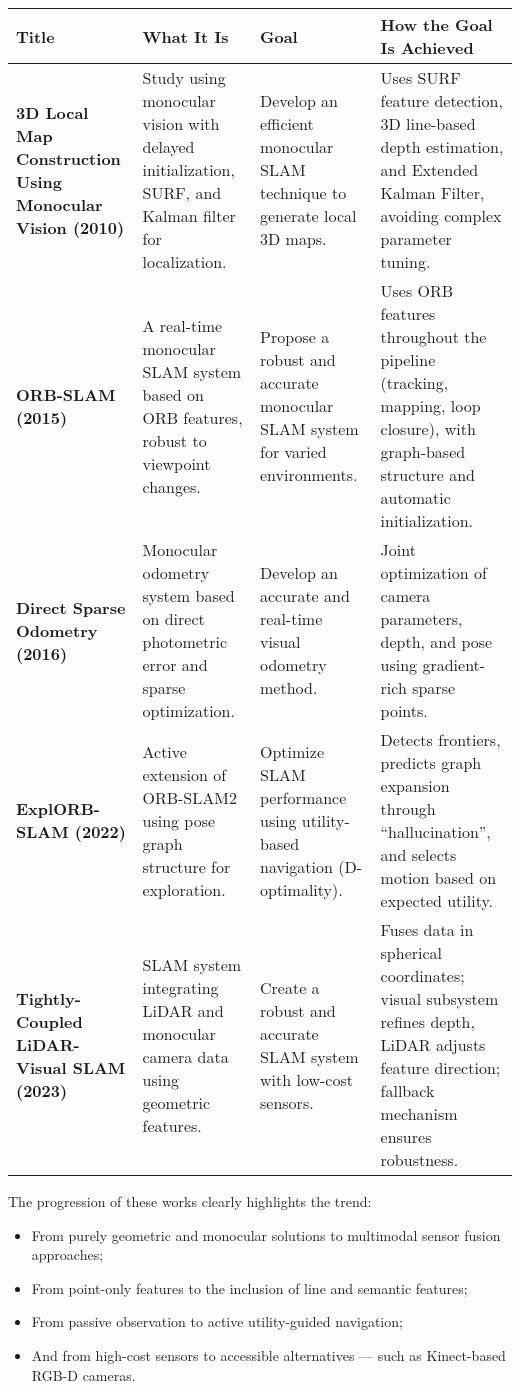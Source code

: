 \documentclass[a4paper,12pt]{article}
\newcommand{\cellwrap}[1]{\RaggedRight #1\hfill}
\begin{document}
\begin{center}
\sloppy
\begin{tabular}{|p{3cm}|p{4cm}|p{3cm}|p{4cm}|}
\hline
\textbf{Title} & \textbf{What It Is} & \textbf{Goal} & \textbf{How the Goal Is Achieved} \\
\hline
\cellwrap{\textbf{3D Local Map Construction Using Monocular Vision (2010)}} & \cellwrap{Study using monocular vision with delayed initialization, SURF, and Kalman filter for localization.} & \cellwrap{Develop an efficient monocular SLAM technique to generate local 3D maps.} & \cellwrap{Uses SURF feature detection, 3D line-based depth estimation, and Extended Kalman Filter, avoiding complex parameter tuning.} \\
\hline
\cellwrap{\textbf{ORB-SLAM (2015)}} & \cellwrap{A real-time monocular SLAM system based on ORB features, robust to viewpoint changes.} & \cellwrap{Propose a robust and accurate monocular SLAM system for varied environments.} & \cellwrap{Uses ORB features throughout the pipeline (tracking, mapping, loop closure), with graph-based structure and automatic initialization.} \\
\hline
\cellwrap{\textbf{Direct Sparse Odometry (2016)}} & \cellwrap{Monocular odometry system based on direct photometric error and sparse optimization.} & \cellwrap{Develop an accurate and real-time visual odometry method.} & \cellwrap{Joint optimization of camera parameters, depth, and pose using gradient-rich sparse points.} \\
\hline
\cellwrap{\textbf{ExplORB-SLAM (2022)}} & \cellwrap{Active extension of ORB-SLAM2 using pose graph structure for exploration.} & \cellwrap{Optimize SLAM performance using utility-based navigation (D-optimality).} & \cellwrap{Detects frontiers, predicts graph expansion through “hallucination”, and selects motion based on expected utility.} \\
\hline
\cellwrap{\textbf{Tightly-Coupled LiDAR-Visual SLAM (2023)}} & \cellwrap{SLAM system integrating LiDAR and monocular camera data using geometric features.} & \cellwrap{Create a robust and accurate SLAM system with low-cost sensors.} & \cellwrap{Fuses data in spherical coordinates; visual subsystem refines depth, LiDAR adjusts feature direction; fallback mechanism ensures robustness.} \\
\hline
\end{tabular}
\end{center}

The progression of these works clearly highlights the trend:
\begin{itemize}
    \item From purely geometric and monocular solutions to multimodal sensor fusion approaches;
    \item From point-only features to the inclusion of line and semantic features;
    \item From passive observation to active utility-guided navigation;
    \item And from high-cost sensors to accessible alternatives — such as Kinect-based RGB-D cameras.
\end{itemize}
\end{document}
